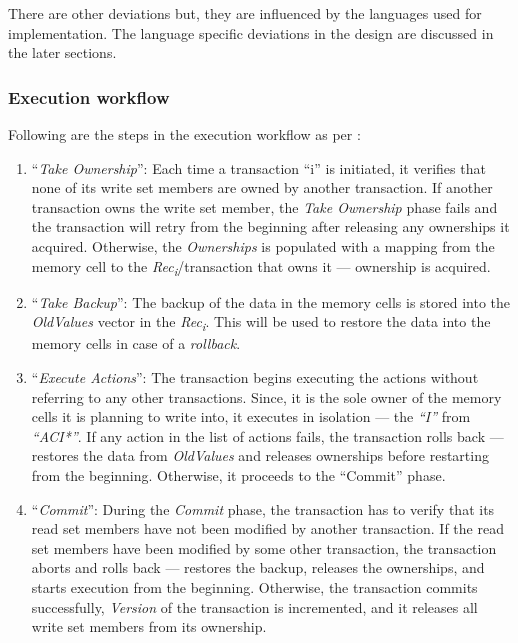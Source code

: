 \documentclass[../main]{subfiles}
\begin{document}
  \par
  There are other deviations but, they are influenced by the languages used for implementation. The language specific deviations in the design are discussed in the later sections. \par

  \subsubsection{Execution workflow}
  \label{sec:exec-workflow}

  \par
  Following are the steps in the execution workflow as per \cite{weimerskirch2008software}\cite{Shavit1997}:

  \par
  \begin{enumerate}

    \item ``{\em Take Ownership}'': Each time a transaction ``i'' is initiated, it verifies that none of its write set members are owned by another transaction. If another transaction owns the write set member, the {\em Take Ownership} phase fails and the transaction will retry from the beginning after releasing any ownerships it acquired. Otherwise, the {\em Ownerships} is populated with a mapping from the memory cell to the {\em Rec\textsubscript{i}}/transaction that owns it --- ownership is acquired.\par

    \item ``{\em Take Backup}'': The backup of the data in the memory cells is stored into the {\em OldValues} vector in the {\em Rec\textsubscript{i}}. This will be used to restore the data into the memory cells in case of a {\em rollback}.\par

    \item ``{\em Execute Actions}'': The transaction begins executing the actions without referring to any other transactions. Since, it is the sole owner of the memory cells it is planning to write into, it executes in isolation --- the {\em ``I''} from {\em ``ACI*''}. If any action in the list of actions fails, the transaction rolls back --- restores the data from {\em OldValues} and releases ownerships before restarting from the beginning. Otherwise, it proceeds to the ``Commit'' phase. \par

    \item ``{\em Commit}'': During the {\em Commit} phase, the transaction has to verify that its read set members have not been modified by another transaction. If the read set members have been modified by some other transaction, the transaction aborts and rolls back --- restores the backup, releases the ownerships, and starts execution from the beginning. Otherwise, the transaction commits successfully, {\em Version} of the transaction is incremented, and it releases all write set members from its ownership.

  \end{enumerate}
\end{document}

